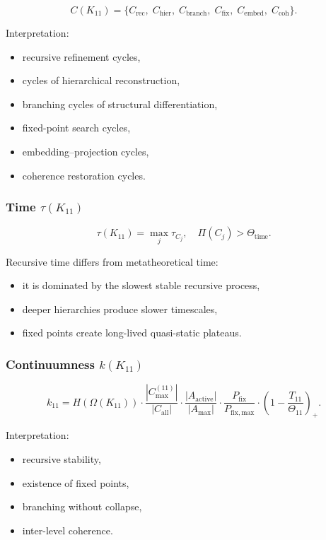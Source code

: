 \[
C(K_{11})=
\{
C_{\mathrm{rec}},\;
C_{\mathrm{hier}},\;
C_{\mathrm{branch}},\;
C_{\mathrm{fix}},\;
C_{\mathrm{embed}},\;
C_{\mathrm{coh}}
\}.
\]

Interpretation:
\begin{itemize}
    \item recursive refinement cycles,
    \item cycles of hierarchical reconstruction,
    \item branching cycles of structural differentiation,
    \item fixed-point search cycles,
    \item embedding–projection cycles,
    \item coherence restoration cycles.
\end{itemize}

\subsubsection{Time $\tau(K_{11})$}

\[
\tau(K_{11})
=
\max_j \tau_{C_j},
\quad
\Pi(C_j)>\Theta_{\mathrm{time}}.
\]

Recursive time differs from metatheoretical time:
\begin{itemize}
    \item it is dominated by the slowest stable recursive process,
    \item deeper hierarchies produce slower timescales,
    \item fixed points create long-lived quasi-static plateaus.
\end{itemize}

\subsubsection{Continuumness $k(K_{11})$}

\[
k_{11}=
H(\Omega(K_{11}))
\cdot
\frac{|C_{\max}^{(11)}|}{|C_{\mathrm{all}}|}
\cdot
\frac{|A_{\mathrm{active}}|}{|A_{\max}|}
\cdot
\frac{P_{\mathrm{fix}}}{P_{\mathrm{fix,max}}}
\cdot
\left(1-\frac{T_{11}}{\Theta_{11}}\right)_+.
\]

Interpretation:
\begin{itemize}
    \item recursive stability,
    \item existence of fixed points,
    \item branching without collapse,
    \item inter-level coherence.
\end{itemize}

